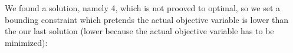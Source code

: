 \documentclass[10pt,a4paper]{article}
\begin{document}

We found a solution, namely 4, which is not prooved to optimal, so we set a
bounding constraint which pretends the actual objective variable is lower than
the our last solution (lower because the actual objective variable has to be
minimized):

\pagebreak
\end{document}
